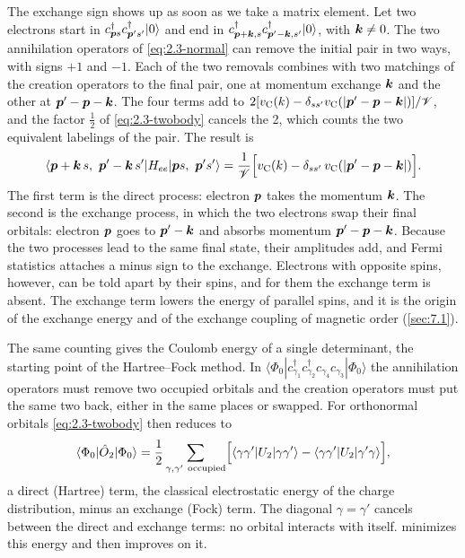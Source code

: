 The exchange sign shows up as soon as we take a matrix element. Let two electrons start in $c^\dagger_{\bm{p}s}c^\dagger_{\bm{p}'s'}|0\rangle$ and end in $c^\dagger_{\bm{p}+\bm{k},s}c^\dagger_{\bm{p}'-\bm{k},s'}|0\rangle$, with $\bm{k} \ne 0$. The two annihilation operators of \cref{eq:2.3-normal} can remove the initial pair in two ways, with signs $+1$ and $-1$. Each of the two removals combines with two matchings of the creation operators to the final pair, one at momentum exchange $\bm{k}$ and the other at $\bm{p}' - \bm{p} - \bm{k}$. The four terms add to $2[v_{\mathrm{C}}(k) - \delta_{ss'}v_{\mathrm{C}}(|\bm{p}' - \bm{p} - \bm{k}|)]/\mathscr{V}$, and the factor $\tfrac12$ of \cref{eq:2.3-twobody} cancels the 2, which counts the two equivalent labelings of the pair. The result is
\begin{equation}
  \langle\vect{p}+\vect{k}\,s,\ \vect{p}'-\vect{k}\,s'|H_{ee}|\vect{p}s,\ \vect{p}'s'\rangle
  = \frac{1}{\Vol}\Bigl[v_{\mathrm{C}}(k) - \delta_{ss'}\,v_{\mathrm{C}}(|\vect{p}' - \vect{p} - \vect{k}|)\Bigr] .
  \label{eq:2.3-direct-exchange}
\end{equation}
The first term is the direct process: electron $\bm{p}$ takes the momentum $\bm{k}$. The second is the exchange process, in which the two electrons swap their final orbitals: electron $\bm{p}$ goes to $\bm{p}' - \bm{k}$ and absorbs momentum $\bm{p}' - \bm{p} - \bm{k}$. Because the two processes lead to the same final state, their amplitudes add, and Fermi statistics attaches a minus sign to the exchange. Electrons with opposite spins, however, can be told apart by their spins, and for them the exchange term is absent. The exchange term lowers the energy of parallel spins, and it is the origin of the exchange energy and of the exchange coupling of magnetic order (\cref{sec:7.1}).

The same counting gives the Coulomb energy of a single determinant, the starting point of the Hartree--Fock method. In $\langle\Phi_0|c^\dagger_{\gamma_1}c^\dagger_{\gamma_2}c_{\gamma_4}c_{\gamma_3}|\Phi_0\rangle$ the annihilation operators must remove two occupied orbitals and the creation operators must put the same two back, either in the same places or swapped. For orthonormal orbitals \cref{eq:2.3-twobody} then reduces to
\begin{equation*}
  \langle\Phi_0|\op{O}_2|\Phi_0\rangle = \frac12\sum_{\gamma,\gamma'\ \mathrm{occupied}}\Bigl[\langle\gamma\gamma'|U_2|\gamma\gamma'\rangle - \langle\gamma\gamma'|U_2|\gamma'\gamma\rangle\Bigr],
\end{equation*}
a direct (Hartree) term, the classical electrostatic energy of the charge distribution, minus an exchange (Fock) term. The diagonal $\gamma = \gamma'$ cancels between the direct and exchange terms: no orbital interacts with itself.  minimizes this energy and then improves on it.

